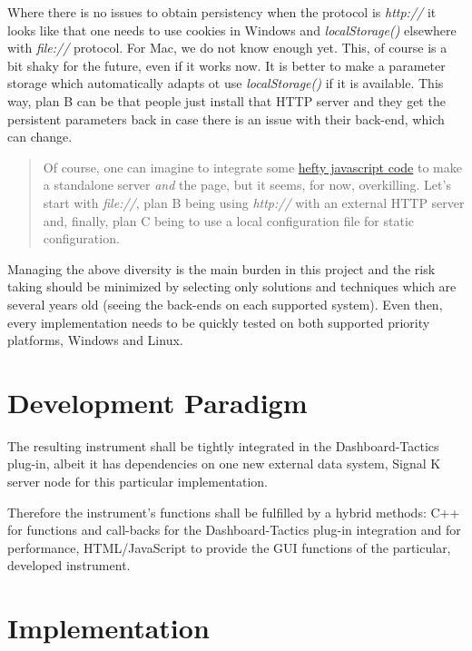 \documentclass[11pt]{article}
\begin{document}
Where there is no issues to obtain persistency when the protocol is
\emph{http://} it looks like that one needs to use cookies in Windows
and \emph{localStorage()} elsewhere with \emph{file://} protocol. For
Mac, we do not know enough yet. This, of course is a bit shaky for the
future, even if it works now. It is better to make a parameter storage
which automatically adapts ot use \emph{localStorage()} if it is
available. This way, plan B can be that people just install that HTTP
server and they get the persistent parameters back in case there is an
issue with their back-end, which can change.

\begin{quote}
Of course, one can imagine to integrate some
\href{https://dev.to/rumkin/how-to-create-js-webserver-without-node-js-1hic}{hefty
javascript code} to make a standalone server \emph{and} the page, but it
seems, for now, overkilling. Let's start with \emph{file://}, plan B
being using \emph{http://} with an external HTTP server and, finally,
plan C being to use a local configuration file for static configuration.
\end{quote}

    Managing the above diversity is the main burden in this project and the
risk taking should be minimized by selecting only solutions and
techniques which are several years old (seeing the back-ends on each
supported system). Even then, every implementation needs to be quickly
tested on both supported priority platforms, Windows and Linux.

    \hypertarget{development-paradigm}{%
\section{Development Paradigm}\label{development-paradigm}}

    The resulting instrument shall be tightly integrated in the
Dashboard-Tactics plug-in, albeit it has dependencies on one new
external data system, Signal K server node for this particular
implementation.

    Therefore the instrument's functions shall be fulfilled by a hybrid
methods: C++ for functions and call-backs for the Dashboard-Tactics
plug-in integration and for performance, HTML/JavaScript to provide the
GUI functions of the particular, developed instrument.

    \hypertarget{implementation}{%
\section{Implementation}\label{implementation}}
\end{document}
